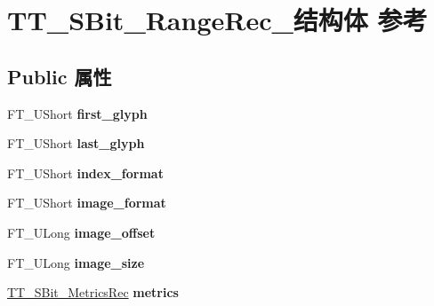\hypertarget{struct_t_t___s_bit___range_rec__}{}\section{T\+T\+\_\+\+S\+Bit\+\_\+\+Range\+Rec\+\_\+结构体 参考}
\label{struct_t_t___s_bit___range_rec__}
\subsection*{Public 属性}
\begin{DoxyCompactItemize}
\item 
\mbox{\label{struct_t_t___s_bit___range_rec___a4593c489959cf2dfc775970d21f3162d}} 
F\+T\+\_\+\+U\+Short {\bfseries first\+\_\+glyph}
\item 
\mbox{\label{struct_t_t___s_bit___range_rec___a1690b0033a710c685870da8aee88ae18}} 
F\+T\+\_\+\+U\+Short {\bfseries last\+\_\+glyph}
\item 
\mbox{\label{struct_t_t___s_bit___range_rec___a6b5d74c7fb4b8bf54d40ca231bdb42da}} 
F\+T\+\_\+\+U\+Short {\bfseries index\+\_\+format}
\item 
\mbox{\label{struct_t_t___s_bit___range_rec___a8925a35b94f8aa9cdf76f60f4e3293a0}} 
F\+T\+\_\+\+U\+Short {\bfseries image\+\_\+format}
\item 
\mbox{\label{struct_t_t___s_bit___range_rec___ae722956e1271128a44764e6126437c23}} 
F\+T\+\_\+\+U\+Long {\bfseries image\+\_\+offset}
\item 
\mbox{\label{struct_t_t___s_bit___range_rec___ad9ccb1529468dfcaf9e7a8946611413f}} 
F\+T\+\_\+\+U\+Long {\bfseries image\+\_\+size}
\item 
\mbox{\label{struct_t_t___s_bit___range_rec___a79be8a9d51100d82b2d9582db861157a}} 
\hyperlink{struct_t_t___s_bit___metrics_rec__}{T\+T\+\_\+\+S\+Bit\+\_\+\+Metrics\+Rec} {\bfseries metrics}
\item 
\mbox{\label{struct_t_t___s_bit___range_rec___afd9437150f8d9f784f98da6d61223464}} 

\end{DoxyCompactItemize}
